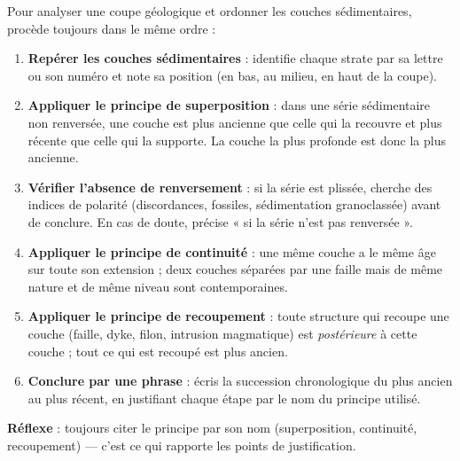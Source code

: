 \documentclass[11pt]{article}
\begin{document}
\begin{methode}
Pour analyser une coupe géologique et ordonner les couches sédimentaires, procède toujours dans le même ordre :
\begin{enumerate}
\item \textbf{Repérer les couches sédimentaires} : identifie chaque strate par sa lettre ou son numéro et note sa position (en bas, au milieu, en haut de la coupe).
\item \textbf{Appliquer le principe de superposition} : dans une série sédimentaire non renversée, une couche est plus ancienne que celle qui la recouvre et plus récente que celle qui la supporte. La couche la plus profonde est donc la plus ancienne.
\item \textbf{Vérifier l'absence de renversement} : si la série est plissée, cherche des indices de polarité (discordances, fossiles, sédimentation granoclassée) avant de conclure. En cas de doute, précise « si la série n'est pas renversée ».
\item \textbf{Appliquer le principe de continuité} : une même couche a le même âge sur toute son extension ; deux couches séparées par une faille mais de même nature et de même niveau sont contemporaines.
\item \textbf{Appliquer le principe de recoupement} : toute structure qui recoupe une couche (faille, dyke, filon, intrusion magmatique) est \emph{postérieure} à cette couche ; tout ce qui est recoupé est plus ancien.
\item \textbf{Conclure par une phrase} : écris la succession chronologique du plus ancien au plus récent, en justifiant chaque étape par le nom du principe utilisé.
\end{enumerate}
\textbf{Réflexe} : toujours citer le principe par son nom (superposition, continuité, recoupement) — c'est ce qui rapporte les points de justification.
\end{methode}
\end{document}
